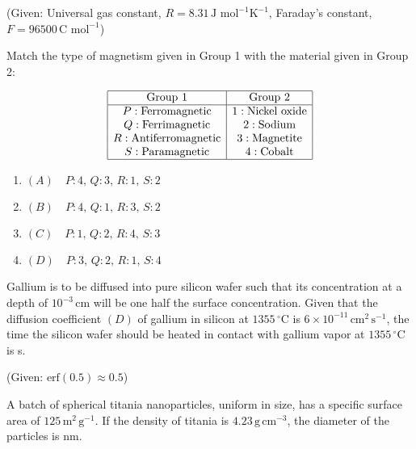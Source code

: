     (Given: Universal gas constant, $R = 8.31 \, \text{J mol}^{-1} \text{K}^{-1}$, Faraday's constant, $F = 96500 \, \text{C mol}^{-1}$)
    
    \bigskip

    \item Match the type of magnetism given in Group 1 with the material given in Group 2:
    
    \[
    \begin{array}{|c|c|}
    \hline
    \text{Group 1} & \text{Group 2} \\
    \hline
    P: \text{Ferromagnetic} & 1: \text{Nickel oxide} \\
    Q: \text{Ferrimagnetic} & 2: \text{Sodium} \\
    R: \text{Antiferromagnetic} & 3: \text{Magnetite} \\
    S: \text{Paramagnetic} & 4: \text{Cobalt} \\
    \hline
    \end{array}
    \]
    
    \begin{enumerate}
        \item $(A) \quad P: 4, \, Q: 3, \, R: 1, \, S: 2$
        \item $(B) \quad P: 4, \, Q: 1, \, R: 3, \, S: 2$
        \item $(C) \quad P: 1, \, Q: 2, \, R: 4, \, S: 3$
        \item $(D) \quad P: 3, \, Q: 2, \, R: 1, \, S: 4$
    \end{enumerate}
    
    \bigskip

    \item Gallium is to be diffused into pure silicon wafer such that its concentration at a depth of $10^{-3} \, \text{cm}$ will be one half the surface concentration. Given that the diffusion coefficient $(D)$ of gallium in silicon at $1355 \, ^\circ \text{C}$ is $6 \times 10^{-11} \, \text{cm}^2 \, \text{s}^{-1}$, the time the silicon wafer should be heated in contact with gallium vapor at $1355 \, ^\circ \text{C}$ is \underline{\hspace{1cm}} s.
    
    (Given: $\text{erf}(0.5) \approx 0.5$)
    \bigskip
    \item A batch of spherical titania nanoparticles, uniform in size, has a specific surface area of $125 \, \text{m}^2 \, \text{g}^{-1}$. If the density of titania is $4.23 \, \text{g} \, \text{cm}^{-3}$, the diameter of the particles is \underline{\hspace{1cm}} nm.
    
